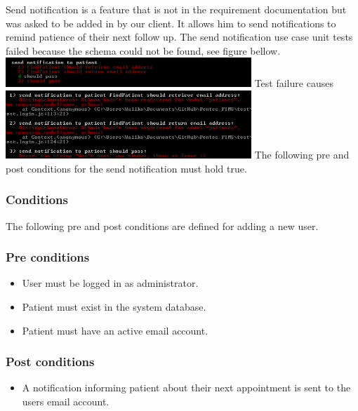 Send notification is a feature that is not in the requirement documentation but was asked to be added in by our client. It allows him to send notifications to remind patience of their next follow up. 
The send notification use case unit tests failed because the schema could not be found, see figure bellow.
\newline 
\newline 
\includegraphics[width=350px]{./TestingDoc/Graphics/SendNotification}
\newline
\newline
Test failure causes
\newline
\newline
\includegraphics[width=350px]{./TestingDoc/Graphics/FailedTests}
\newline
\newline
The following pre and post conditions for the send notification must hold true.
		
\subsubsection*{Conditions}
The following pre and post conditions are defined for adding a new user.
	
\subsubsection*{Pre conditions}	
\begin{itemize}
		\item User must be logged in as administrator.
		\item Patient must exist in the system database.
		\item Patient must have an active email account.
\end{itemize}	

\subsubsection*{Post conditions}	
\begin{itemize}
		\item A notification informing patient about their next appointment is sent to the users email account. 
\end{itemize}	

